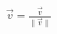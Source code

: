 \documentclass[preview]{standalone}
\begin{document}
\begin{align*}
\vec{v} = \frac{\vec{v}}{\|\vec{v}\|}
\end{align*}
\end{document}
